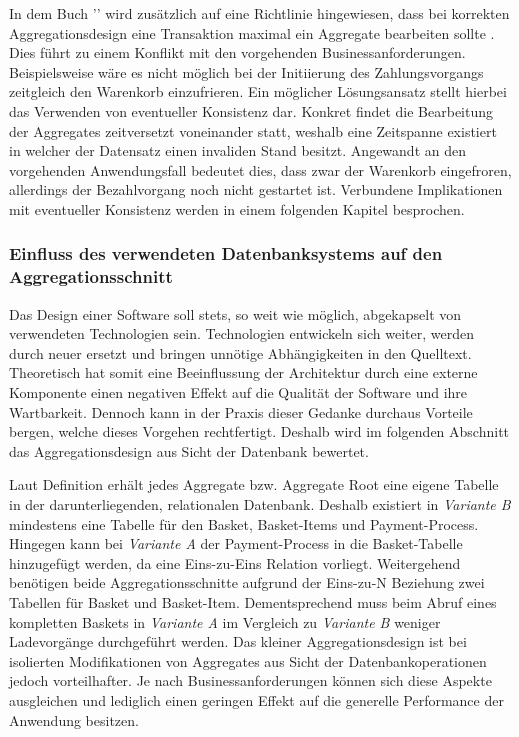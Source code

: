 In dem Buch '' wird zusätzlich auf eine Richtlinie hingewiesen, dass bei korrekten Aggregationsdesign eine Transaktion maximal ein Aggregate bearbeiten sollte \cite[S. 354]{Vernon.2015}. Dies führt zu einem Konflikt mit den vorgehenden Businessanforderungen. Beispielsweise wäre es nicht möglich bei der Initiierung des Zahlungsvorgangs zeitgleich den Warenkorb einzufrieren. Ein möglicher Lösungsansatz stellt hierbei das Verwenden von eventueller Konsistenz dar. Konkret findet die Bearbeitung der Aggregates zeitversetzt voneinander statt, weshalb eine Zeitspanne existiert in welcher der Datensatz einen invaliden Stand besitzt. Angewandt an den vorgehenden Anwendungsfall bedeutet dies, dass zwar der Warenkorb eingefroren, allerdings der Bezahlvorgang noch nicht gestartet ist. Verbundene Implikationen mit eventueller Konsistenz werden in einem folgenden Kapitel besprochen.

\subsubsection{Einfluss des verwendeten Datenbanksystems auf den Aggregationsschnitt}

Das Design einer Software soll stets, so weit wie möglich, abgekapselt von verwendeten Technologien sein. Technologien entwickeln sich weiter, werden durch neuer ersetzt und bringen unnötige Abhängigkeiten in den Quelltext. Theoretisch hat somit eine Beeinflussung der Architektur durch eine externe Komponente einen negativen Effekt auf die Qualität der Software und ihre Wartbarkeit. Dennoch kann in der Praxis dieser Gedanke durchaus Vorteile bergen, welche dieses Vorgehen rechtfertigt. Deshalb wird im folgenden Abschnitt das Aggregationsdesign aus Sicht der Datenbank bewertet.

Laut Definition erhält jedes Aggregate bzw. Aggregate Root eine eigene Tabelle in der darunterliegenden, relationalen Datenbank. Deshalb existiert in \emph{Variante B} mindestens eine Tabelle für den Basket, Basket-Items und Payment-Process. Hingegen kann bei \emph{Variante A} der Payment-Process in die Basket-Tabelle hinzugefügt werden, da eine Eins-zu-Eins Relation vorliegt. Weitergehend benötigen beide Aggregationsschnitte aufgrund der Eins-zu-N Beziehung zwei Tabellen für Basket und Basket-Item. Dementsprechend muss beim Abruf eines kompletten Baskets in \emph{Variante A} im Vergleich zu \emph{Variante B} weniger Ladevorgänge durchgeführt werden. Das kleiner Aggregationsdesign ist bei isolierten Modifikationen von Aggregates aus Sicht der Datenbankoperationen jedoch vorteilhafter. Je nach Businessanforderungen können sich diese Aspekte ausgleichen und lediglich einen geringen Effekt auf die generelle Performance der Anwendung besitzen.

